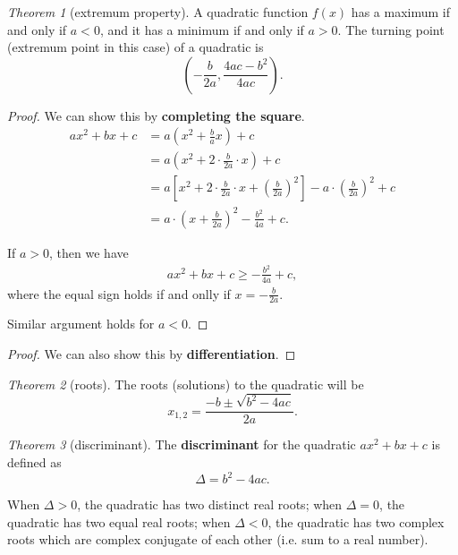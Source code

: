 \documentclass[8pt]{article}
\theoremstyle{remark}
\newtheorem{theorem}{Theorem}[section]
\begin{document}
        \begin{theorem}[extremum property]
            A quadratic function $f(x)$ has a maximum if and only if $a < 0$, and it has a minimum if and only if $a > 0$. The turning point (extremum point in this case) of a quadratic is
            $$
                \left(-\frac{b}{2a}, \frac{4ac - b^2}{4ac}\right).
            $$

            \begin{proof}
                We can show this by \textbf{completing the square}.
                \begin{align*}
                    ax^2 + bx + c &= a \left(x^2 + \frac{b}{a} x\right) + c\\
                    &= a \left(x^2 + 2 \cdot \frac{b}{2a} \cdot x \right) + c\\
                    &= a \left[x^2 + 2 \cdot \frac{b}{2a} \cdot x + \left(\frac{b}{2a}\right)^2\right] - a \cdot \left(\frac{b}{2a}\right)^2 + c\\
                    &= a \cdot \left(x + \frac{b}{2a}\right)^2 - \frac{b^2}{4a} + c.
                \end{align*}

                If $a > 0$, then we have
                \begin{align*}
                    ax^2 + bx + c \geq -\frac{b^2}{4a} + c,
                \end{align*}
                where the equal sign holds if and onlly if $x = - \frac{b}{2a}$.

                Similar argument holds for $a < 0$.
            \end{proof}

            \begin{proof}
                We can also show this by \textbf{differentiation}.
            \end{proof}
        \end{theorem}

        \begin{theorem}[roots]
            The roots (solutions) to the quadratic will be
            $$
                x_{1, 2} = \frac{-b \pm \sqrt{b^2 - 4ac}}{2a}.
            $$
        \end{theorem}

        \begin{theorem}[discriminant]
            The \textbf{discriminant} for the quadratic $ax^2 + bx + c$ is defined as
            $$
                \Delta = b^2 - 4ac.
            $$

            When $\Delta > 0$, the quadratic has two distinct real roots; when $\Delta = 0$, the quadratic has two equal real roots; when $\Delta < 0$, the quadratic has two complex roots which are complex conjugate of each other (i.e. sum to a real number).
        \end{theorem}
\end{document}
